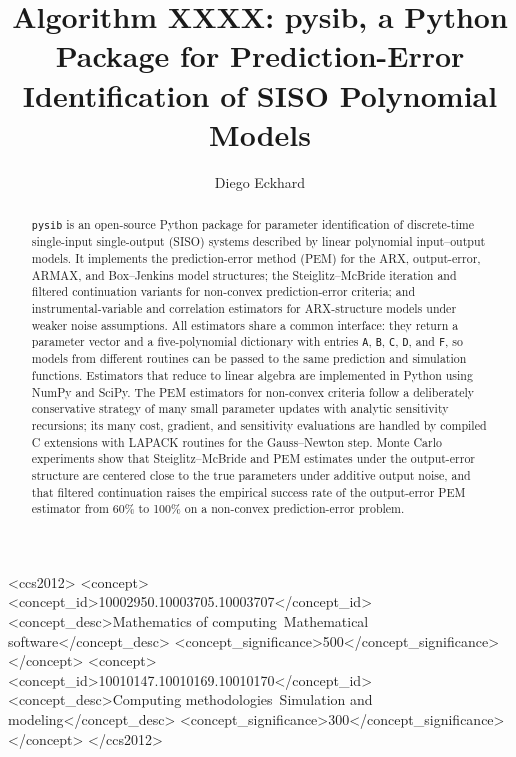 \documentclass[acmsmall,screen,review]{acmart}
\begin{document}
\title{Algorithm XXXX: pysib, a Python Package for Prediction-Error
       Identification of SISO Polynomial Models}

\author{Diego Eckhard}

\renewcommand{\shortauthors}{Eckhard}

\begin{abstract}
\texttt{pysib} is an open-source Python package for parameter identification
of discrete-time single-input single-output (SISO) systems described by
linear polynomial input--output models.  It implements the prediction-error
method (PEM) for the ARX, output-error, ARMAX, and Box--Jenkins model
structures; the Steiglitz--McBride iteration and filtered continuation
variants for non-convex prediction-error criteria; and instrumental-variable
and correlation estimators for ARX-structure models under weaker noise
assumptions.  All estimators share a common interface:
they return a parameter vector and a five-polynomial dictionary with entries
\texttt{A}, \texttt{B}, \texttt{C}, \texttt{D}, and \texttt{F}, so models
from different routines can be passed to the same prediction and
simulation functions.  Estimators that reduce to linear algebra are
implemented in Python using NumPy and SciPy.  The PEM estimators for
non-convex criteria follow a deliberately conservative strategy of many small parameter updates
with analytic sensitivity recursions; its many cost, gradient, and
sensitivity evaluations are handled by compiled C extensions with LAPACK
routines for the Gauss--Newton step.  Monte Carlo experiments show that Steiglitz--McBride and
PEM estimates under the output-error structure are centered close to the true
parameters under additive output noise, and that filtered continuation raises
the empirical success rate of the output-error PEM estimator from 60\% to
100\% on a non-convex prediction-error problem.
\end{abstract}

\begin{CCSXML}
<ccs2012>
  <concept>
    <concept_id>10002950.10003705.10003707</concept_id>
    <concept_desc>Mathematics of computing~Mathematical software</concept_desc>
    <concept_significance>500</concept_significance>
  </concept>
  <concept>
    <concept_id>10010147.10010169.10010170</concept_id>
    <concept_desc>Computing methodologies~Simulation and modeling</concept_desc>
    <concept_significance>300</concept_significance>
  </concept>
</ccs2012>
\end{CCSXML}
\end{document}
